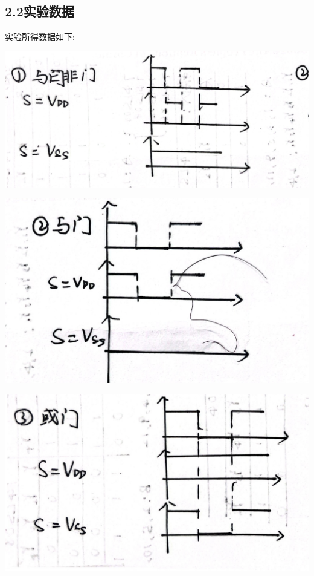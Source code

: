 \documentclass{ctexart}
\begin{document}
    \subsection*{2.2实验数据}
    实验所得数据如下:
    
    \begin{minipage}[c]{0.6\textwidth}
        \centering
        \includegraphics[width=1\linewidth]{3.2.1.JPG} 
    \end{minipage}
    \begin{minipage}[c]{0.4\textwidth}
        \centering
        \includegraphics[width=1\linewidth]{3.2.2.JPG} 
    \end{minipage}
    \begin{minipage}[c]{0.6\textwidth}
        \centering
        \includegraphics[width=1\linewidth]{3.2.3.JPG} 
    \end{minipage}
\end{document}
